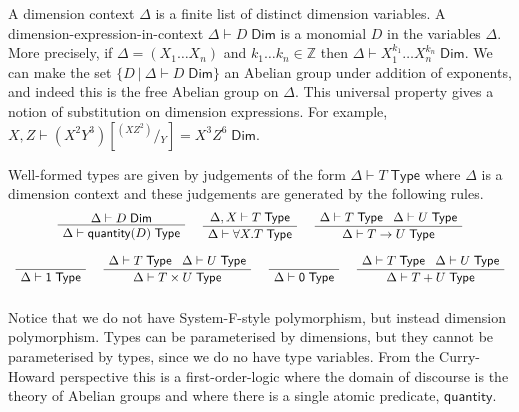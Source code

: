 \documentclass[a4paper,UKenglish]{lipics}
\newcommand{\msf}[1]{\mathsf{#1}} %
\newcommand{\Ab}{\msf{Ab}}
\newcommand{\LAb}{\msf{L}_{\msf{Ab}}}
\newcommand{\C}{\mathcal{C}}
\newcommand{\unitTy}{\msf{1}}
\newcommand{\emptyTy}{\msf{0}}
\newcommand{\qnt}{\msf{quantity}}
\newcommand{\Tj}[2]{#1 \vdash #2 \; \msf{ Type}}
\newcommand{\Dj}[2]{#1 \vdash #2 \; \msf{ Dim}}
\newcommand{\Dim}{D}
\newcommand{\Dvar}{X}
\begin{document}
\vspace{3mm} 
A dimension context $\Delta$ is a finite list of distinct
dimension variables.
A dimension-expression-in-context $\Dj\Delta \Dim$ is a monomial
$\Dim$ in the variables $\Delta$.
More precisely,
if $\Delta=(\Dvar_1\dots \Dvar_n)$ and $k_1\dots k_n\in\mathbb Z$
then $\Dj \Delta{\Dvar_1^{k_1}\dots \Dvar_n^{k_n}}$.
We can make the set $\{\Dim~|~\Dj \Delta \Dim\}$ an Abelian group under addition of
exponents, and indeed this is the free Abelian group on $\Delta$.
This universal property gives a notion of substitution on dimension expressions.
For example,
$\Dj{X,Z}{(X^2Y^3)[^{(XZ^2)}\!/\!_Y]=X^3Z^6}$.


\vspace{3mm}  Well-formed types are given by judgements of the form $\Tj\Delta  T$ where
$\Delta$ is a dimension context and these judgements are generated by the following rules.
\[\begin{array}{c}
\AxiomC{$\Dj\Delta \Dim$}
		\UnaryInfC{$\Tj\Delta {\qnt(\Dim)}$}
		\DisplayProof

\hspace{5mm}
\AxiomC{$\Tj {\Delta, \Dvar}  T$}
	\UnaryInfC{$\Tj \Delta{ \forall \Dvar.T} $}
	\DisplayProof
\hspace{5mm}
\AxiomC{$\Delta \vdash T \; \msf{ Type} \; \; \; \Delta \vdash U \; \msf{ Type}$}
	\UnaryInfC{$\Delta \vdash T \rightarrow U  \; \msf{ Type}$}
	\DisplayProof
\\ \\
\AxiomC{  $\phantom{\vdash T \; \msf{ Type}}$ }
		\UnaryInfC{$\Delta \vdash \unitTy \; \msf{ Type}$}
	\DisplayProof
\hspace{5mm}
\AxiomC{$\Delta \vdash T \; \msf{ Type} \; \; \; \Delta \vdash U \; \msf{ Type}$}
	\UnaryInfC{$\Delta \vdash T\times U \; \msf{ Type}$}
	\DisplayProof
\hspace{5mm}
\AxiomC{  $\phantom{ \vdash T \; \msf{ Type}}$ }
		\UnaryInfC{$\Delta \vdash \emptyTy \; \msf{ Type}$}
	\DisplayProof
\hspace{5mm}
\AxiomC{$\Delta \vdash T \; \msf{ Type} \; \; \; \Delta \vdash U \; \msf{ Type}$}
	\UnaryInfC{$\Delta \vdash T + U \; \msf{ Type}$}
	\DisplayProof
\\ \\
\end{array}\]
Notice that we do not have System-F-style polymorphism, but instead dimension polymorphism. Types can be parameterised by dimensions, but they cannot be parameterised by types, since we do no have type variables. From the Curry-Howard perspective this is a first-order-logic where the domain of discourse is the theory of Abelian groups and where there is a single atomic predicate, $\qnt$.
\end{document}
